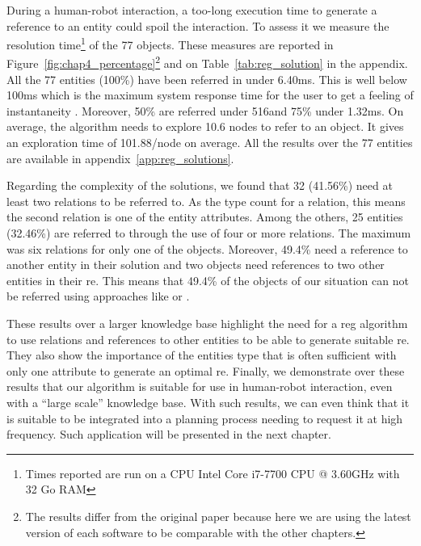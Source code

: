 During a human-robot interaction, a too-long execution time to generate a reference to an entity could spoil the interaction. To assess it we measure the resolution time\footnote{Times reported are run on a CPU Intel Core i7-7700 CPU @ 3.60GHz with 32 Go RAM} of the 77 objects. These measures are reported in Figure~\ref{fig:chap4_percentage}\footnote{The results differ from the original paper because here we are using the latest version of each software to be comparable with the other chapters.} and on Table~\ref{tab:reg_solution} in the appendix. All the 77 entities (100\%) have been referred in under 6.40ms. This is well below 100ms which is the maximum system response time for the user to get a feeling of instantaneity \cite{miller_1968_response}. Moreover, 50\% are referred under 516\us and 75\% under 1.32ms. On average, the algorithm needs to explore 10.6 nodes to refer to an object. It gives an exploration time of 101.88\us/node on average. All the results over the 77 entities are available in appendix~\ref{app:reg_solutions}.

Regarding the complexity of the solutions, we found that 32 (41.56\%) need at least two relations to be referred to. As the type count for a relation, this means the second relation is one of the entity attributes. Among the others, 25 entities (32.46\%) are referred to through the use of four or more relations. The maximum was six relations for only one of the objects. Moreover, 49.4\% need a reference to another entity in their solution and two objects need references to two other entities in their \acrshort{re}. This means that 49.4\% of the objects of our situation can not be referred using approaches like \cite{ros_2010_which} or \cite{dale_1995_computational}.

These results over a larger knowledge base highlight the need for a \acrshort{reg} algorithm to use relations and references to other entities to be able to generate suitable \acrshort{re}. They also show the importance of the entities type that is often sufficient with only one attribute to generate an optimal \acrshort{re}. Finally, we demonstrate over these results that our algorithm is suitable for use in human-robot interaction, even with a ``large scale'' knowledge base. With such results, we can even think that it is suitable to be integrated into a planning process needing to request it at high frequency. Such application will be presented in the next chapter.


